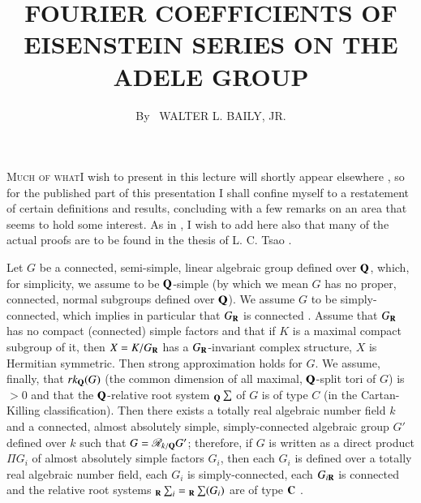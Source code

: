 \title{FOURIER COEFFICIENTS OF EISENSTEIN SERIES ON THE ADELE GROUP}

\author{By~ WALTER L. BAILY, JR.}

\date{}
\maketitle

\textsc{Much of what}\pageoriginale I wish to present in this lecture will shortly appear elsewhere \cite{art1-key3}, so for the published part of this presentation I shall confine myself to a restatement of certain definitions and results, concluding with a few remarks on an area that seems to hold some interest. As in \cite{art1-key3}, I wish to add here also that many of the actual proofs are to be found in the thesis of L. C. Tsao  \cite{art1-key8}.

Let $G$ be a connected, semi-simple, linear algebraic group defined over $\mathbf{Q}$, which, for simplicity, we assume to be $\mathbf{Q}$-simple (by which we mean $G$ has no proper, connected, normal subgroups defined over $\mathbf{Q}$). We assume $G$ to be simply-connected, which implies in particular that $G_{\mathbf{R}}$ is connected \cite[Ch. 7, \S 5]{art1-key2}. Assume that $G_{\mathbf{R}}$ has no compact (connected) simple factors and that if $K$ is a maximal compact subgroup of it, then $X=K/G_{\mathbf{R}}$ has a $G_{\mathbf{R}}$-invariant complex structure, \iec $X$ is Hermitian symmetric. Then \cite{art1-key6} strong approximation holds for $G$. We assume, finally, that $rk_{\mathbf{Q}}(G)$ (the common dimension of all maximal, $\mathbf{Q}$-split tori of $G$) is $> 0$ and that the $\mathbf{Q}$-relative root system ${}_{\mathbf{Q}}\sum$ of $G$ is of type $C$ (in the Cartan-Killing classification). Then there exists a totally real algebraic number field $k$ and a connected, almost absolutely simple, simply-connected algebraic group $G'$ defined over $k$ such that $G=\mathscr{R}_{k/\mathbf{Q}}G'$; therefore, if $G$ is written as a direct product $\Pi G_i$ of almost absolutely simple factors $G_i$, then each $G_i$ is defined over a totally real algebraic number field, each $G_i$ is simply-connected, each $G_{i\mathbf{R}}$ is connected and the relative root systems ${}_{\mathbf{R}}\sum_i={}_{\mathbf{R}}\sum(G_i)$ are of type $\mathbf{C}$ \cite{art1-key4}.


